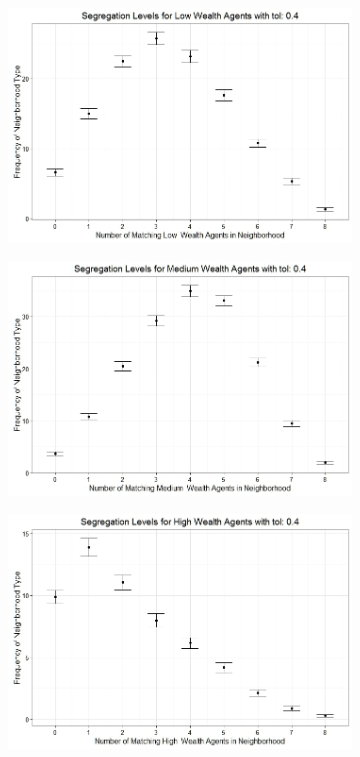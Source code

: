 \begin{figure}[h!]
\begin{subfigure}{.5\textwidth}
\end{subfigure}%
\begin{subfigure}{.5\textwidth}
  \centering
\includegraphics[scale=.35]{figures/2000_4_Low.jpeg}
\end{subfigure}
\hfill \break \hfill \break
\begin{subfigure}{.5\textwidth}
  \centering
\includegraphics[scale=.35]{figures/2000_4_Med.jpeg}
\end{subfigure}%
\begin{subfigure}{.5\textwidth}
  \centering
\includegraphics[scale=.35]{figures/2000_4_High.jpeg}

\end{subfigure}
\end{figure}
